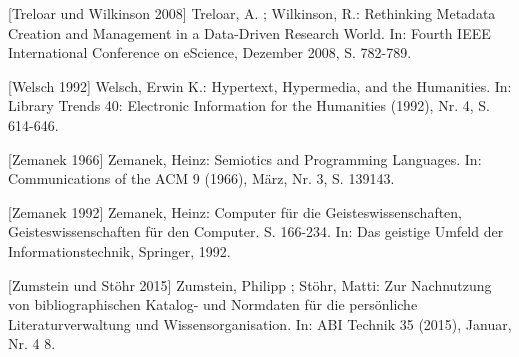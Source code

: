 \documentclass[a4paper,
fontsize=11pt,
oneside,
numbers=noperiodatend,
parskip=half-,
bibliography=totoc,
final
]{scrartcl}
\begin{document}
{[}Treloar und Wilkinson 2008{]} Treloar, A. ; Wilkinson, R.: Rethinking
Metadata Creation and Management in a Data-Driven Research World. In:
Fourth IEEE International Conference on eScience, Dezember 2008, S.
782-789.

{[}Welsch 1992{]} Welsch, Erwin K.: Hypertext, Hypermedia, and the
Humanities. In: Library Trends 40: Electronic Information for the
Humanities (1992), Nr. 4, S. 614-646.

{[}Zemanek 1966{]} Zemanek, Heinz: Semiotics and Programming Languages.
In: Communications of the ACM 9 (1966), März, Nr. 3, S. 139143.

{[}Zemanek 1992{]} Zemanek, Heinz: Computer für die
Geisteswissenschaften, Geisteswissenschaften für den Computer. S.
166-234. In: Das geistige Umfeld der Informationstechnik, Springer,
1992.

{[}Zumstein und Stöhr 2015{]} Zumstein, Philipp ; Stöhr, Matti: Zur
Nachnutzung von bibliographischen Katalog- und Normdaten für die
persönliche Literaturverwaltung und Wissensorganisation. In: ABI Technik
35 (2015), Januar, Nr. 4 8.

\end{document}
